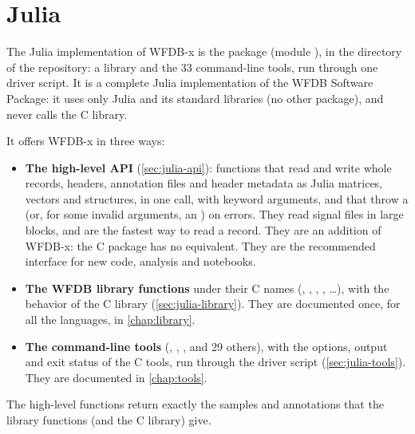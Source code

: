 \chapter{Julia}
\label{chap:julia}

The Julia implementation of WFDB-x is the package  (module ), in
the directory  of the repository: a library and the 33 command-line tools,
run through one driver script. It is a complete Julia implementation of the WFDB Software
Package: it uses only Julia and its standard libraries (no other package), and never calls
the C library.

It offers WFDB-x in three ways:
\begin{itemize}
\item \textbf{The high-level API} (\cref{sec:julia-api}): functions that read and write
  whole records, headers, annotation files and header metadata as Julia matrices, vectors
  and structures, in one call, with keyword arguments, and that throw a 
  (or, for some invalid arguments, an ) on errors. They read signal
  files in large blocks, and are the fastest way to read a record. They are an addition
  of WFDB-x: the C package has no equivalent. They are the recommended interface for new
  code, analysis and notebooks.
\item \textbf{The WFDB library functions} under their C names (,
  , , , \ldots), with the behavior of the C library
  (\cref{sec:julia-library}). They are documented once, for all the languages, in
  \cref{chap:library}.
\item \textbf{The command-line tools} (, , ,
   and 29 others), with the options, output and exit status of the C tools,
  run through the driver script  (\cref{sec:julia-tools}). They
  are documented in \cref{chap:tools}.
\end{itemize}
The high-level functions return exactly the samples and annotations that the library
functions (and the C library) give.

